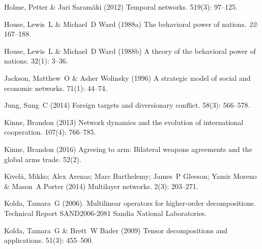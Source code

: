 \documentclass[3p,times,twocolumn,authoryear,12pt]{elsarticle}
\begin{document}
\begin{thebibliography}{}
Holme, Petter  \& Jari Saram{\"a}ki (2012) Temporal networks.
 { 519\/}(3): 97--125.

House, Lewis~L  \& Michael~D Ward (1988a) The behavioral power of nations.
 {\em 22}: 167--188.

House, Lewis~L  \& Michael~D Ward (1988b) A theory of the behavioral power of
  nations.
 { 32\/}(1): 3--36.

Jackson, Matthew~O  \& Asher Wolinsky (1996) A strategic model of social and
  economic networks.
 { 71\/}(1): 44--74.

Jung, Sung~C (2014) Foreign targets and diversionary conflict.
 { 58\/}(3): 566--578.

Kinne, Brandon (2013) Network dynamics and the evolution of international
  cooperation.
 { 107\/}(4): 766--785.

Kinne, Brandon (2016) Agreeing to arm: Bilateral weapons agreements and the
  global arms trade.
 { 52\/}(2).

Kivel{\"a}, Mikko; Alex Arenas; Marc Barthelemy; James~P Gleeson; Yamir Moreno
  \& Mason~A Porter (2014) Multilayer networks.
 { 2\/}(3): 203--271.

Kolda, Tamara~G (2006).
\newblock Multilinear operators for higher-order decompositions.
\newblock Technical Report SAND2006-2081 Sandia National Laboratories.

Kolda, Tamara~G  \& Brett~W Bader (2009) Tensor decompositions and
  applications.
 { 51\/}(3): 455--500.


\end{thebibliography}
\end{document}
